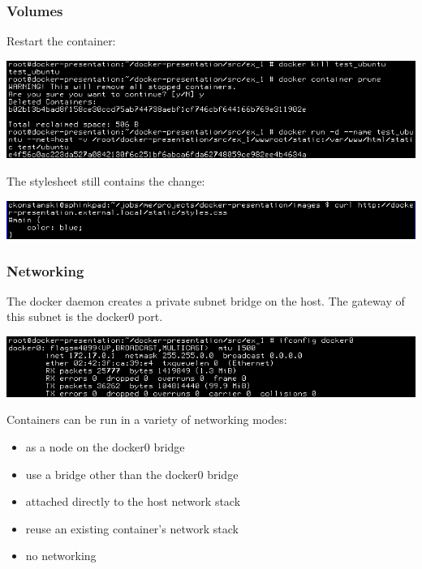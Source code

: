 \documentclass[helvetica,english,utf8,notitle,nologo]{beamer}
\begin{document}
\begin{frame}
  \frametitle{Volumes}

  Restart the container:

  \includegraphics[scale=0.44]{image_22}

  The stylesheet still contains the change:

  \includegraphics[scale=0.44]{image_23}
\end{frame}

\begin{frame}
  \frametitle{Networking}

  The docker daemon creates a private subnet bridge on the host. The
  gateway of this subnet is the docker0 port.

  \includegraphics[scale=0.44]{image_24}

  Containers can be run in a variety of networking modes:

  \begin{itemize}
  \item as a node on the docker0 bridge
  \item use a bridge other than the docker0 bridge
  \item attached directly to the host network stack
  \item reuse an existing container's network stack
  \item no networking
  \end{itemize}
\end{frame}
\end{document}

